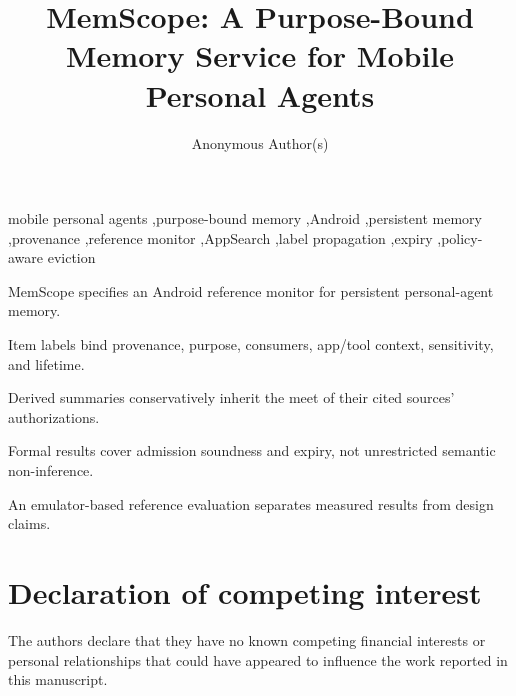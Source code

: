 \documentclass[preprint,12pt,authoryear]{elsarticle}
\theoremstyle{remark}
\begin{document}
\begin{frontmatter}

\title{MemScope: A Purpose-Bound Memory Service for Mobile Personal Agents}

\author[inst1]{Anonymous Author(s)}

\begin{abstract}

\end{abstract}

\begin{keyword}
mobile personal agents \sep purpose-bound memory \sep Android \sep persistent memory \sep provenance \sep reference monitor \sep AppSearch \sep label propagation \sep expiry \sep policy-aware eviction
\end{keyword}

\end{frontmatter}

\begin{highlights}
\item MemScope specifies an Android reference monitor for persistent personal-agent memory.
\item Item labels bind provenance, purpose, consumers, app/tool context, sensitivity, and lifetime.
\item Derived summaries conservatively inherit the meet of their cited sources' authorizations.
\item Formal results cover admission soundness and expiry, not unrestricted semantic non-inference.
\item An emulator-based reference evaluation separates measured results from design claims.
\end{highlights}

















\appendix





\section*{Declaration of competing interest}
The authors declare that they have no known competing financial interests or personal relationships that could have appeared to influence the work reported in this manuscript.
\end{document}
